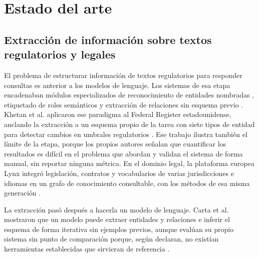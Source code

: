 \documentclass[12pt,a4paper]{report}
\begin{document}
\section{Estado del arte}
\label{sec:estado_arte}

\subsection{Extracción de información sobre textos regulatorios y legales}

El problema de estructurar información de textos regulatorios para responder consultas es anterior a los modelos de lenguaje. Los sistemas de esa etapa encadenaban módulos especializados de reconocimiento de entidades nombradas \cite{lample2016neural}, etiquetado de roles semánticos \cite{he2017deep} y extracción de relaciones sin esquema previo \cite{delcorro2013clausie,etzioni2011open}. Khetan et al. aplicaron ese paradigma al Federal Register estadounidense, anclando la extracción a un esquema propio de la tarea con siete tipos de entidad para detectar cambios en umbrales regulatorios \cite{khetan2021kganchored}. Ese trabajo ilustra también el límite de la etapa, porque los propios autores señalan que cuantificar los resultados es difícil en el problema que abordan y validan el sistema de forma manual, sin reportar ninguna métrica. En el dominio legal, la plataforma europea Lynx integró legislación, contratos y vocabularios de varias jurisdicciones e idiomas en un grafo de conocimiento consultable, con los métodos de esa misma generación \cite{morenoschneider2022lynx}.

La extracción pasó después a hacerla un modelo de lenguaje. Carta et al. mostraron que un modelo puede extraer entidades y relaciones e inferir el esquema de forma iterativa sin ejemplos previos, aunque evalúan su propio sistema sin punto de comparación porque, según declaran, no existían herramientas establecidas que sirvieran de referencia \cite{carta2023iterative}.
\end{document}
